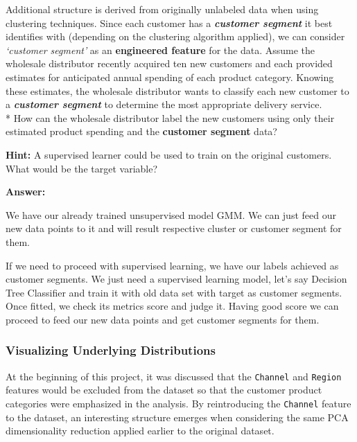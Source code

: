 \documentclass[11pt]{article}
\begin{document}
Additional structure is derived from originally unlabeled data when
using clustering techniques. Since each customer has a
\textbf{\emph{customer segment}} it best identifies with (depending on
the clustering algorithm applied), we can consider \emph{`customer
segment'} as an \textbf{engineered feature} for the data. Assume the
wholesale distributor recently acquired ten new customers and each
provided estimates for anticipated annual spending of each product
category. Knowing these estimates, the wholesale distributor wants to
classify each new customer to a \textbf{\emph{customer segment}} to
determine the most appropriate delivery service.\\
* How can the wholesale distributor label the new customers using only
their estimated product spending and the \textbf{customer segment} data?

\textbf{Hint:} A supervised learner could be used to train on the
original customers. What would be the target variable?

    \textbf{Answer:}

We have our already trained unsupervised model GMM. We can just feed our
new data points to it and will result respective cluster or customer
segment for them.

If we need to proceed with supervised learning, we have our labels
achieved as customer segments. We just need a supervised learning model,
let's say Decision Tree Classifier and train it with old data set with
target as customer segments. Once fitted, we check its metrics score and
judge it. Having good score we can proceed to feed our new data points
and get customer segments for them.

    \hypertarget{visualizing-underlying-distributions}{%
\subsubsection{Visualizing Underlying
Distributions}\label{visualizing-underlying-distributions}}

At the beginning of this project, it was discussed that the
\texttt{\textquotesingle{}Channel\textquotesingle{}} and
\texttt{\textquotesingle{}Region\textquotesingle{}} features would be
excluded from the dataset so that the customer product categories were
emphasized in the analysis. By reintroducing the
\texttt{\textquotesingle{}Channel\textquotesingle{}} feature to the
dataset, an interesting structure emerges when considering the same PCA
dimensionality reduction applied earlier to the original dataset.
\end{document}
